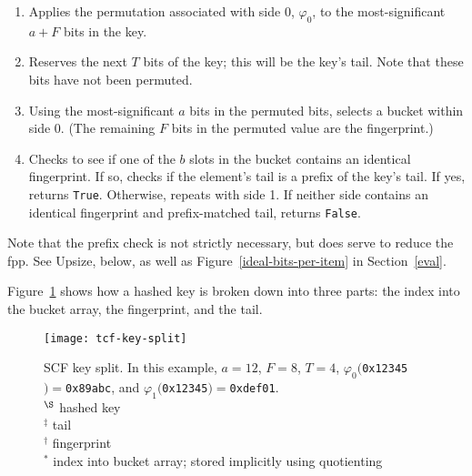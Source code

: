 \documentclass[letterpaper,twocolumn,10pt]{article}
\newcommand{\ints}{\mathbb{Z}}
\newcommand{\dotcup}{\ensuremath{\mathaccent\cdot\cup}}
\newcommand{\TCF}{SCF}
\newcommand{\TCF}{TCF}
\begin{document}
\begin{enumerate}
\item Applies the permutation associated with side 0, $\varphi_0$, to the most-significant $a + F$ bits in the key. %
\item Reserves the next $T$ bits of the key; this will be the key's tail.
Note that these bits have not been permuted.
\item Using the most-significant $a$ bits in the permuted bits, selects a bucket within side 0. %
(The remaining $F$ bits in the permuted value are the fingerprint.)
\item Checks to see if one of the $b$ slots in the bucket contains an identical fingerprint. %
If so, checks if the element's tail is a prefix of the key's tail.
If yes, returns \verb|True|.
Otherwise, repeats with side 1.
If neither side contains an identical fingerprint and prefix-matched tail, returns \verb|False|.
\end{enumerate}

Note that the prefix check is not strictly necessary, but does serve to reduce the fpp.
See Upsize, below, as well as Figure~\ref{ideal-bits-per-item} in Section~\ref{eval}.

Figure~\ref{tcf-key-split} shows how a hashed key is broken down into three parts: the index into the bucket array, the fingerprint, and the tail.

\begin{figure}[b!]
  \texttt{[image: tcf-key-split]}
\caption{\label{tcf-key-split}
\TCF{} key split.
In this example, $a = 12$, $F=8$, $T=4$, $\varphi_0(${\tt 0x12345}$) = ${\tt 0x89abc}, and $\varphi_1(${\tt 0x12345}$) = ${\tt 0xdef01}.\\
${}^\S$ hashed key\\
${}^\ddag$ tail \\
${}^\dag$ fingerprint \\
${}^*$ index into bucket array; stored implicitly using quotienting
}
\end{figure}


\end{document}
